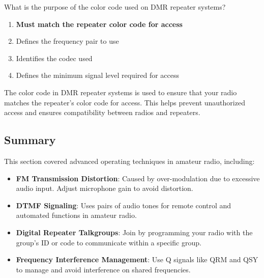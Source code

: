 
\begin{tcolorbox}[colback=gray!10!white,colframe=black!75!black,title={T2B12}]
    What is the purpose of the color code used on DMR repeater systems?
    \begin{enumerate}[label=\Alph*,noitemsep]
        \item \textbf{Must match the repeater color code for access}
        \item Defines the frequency pair to use
        \item Identifies the codec used
        \item Defines the minimum signal level required for access
    \end{enumerate}
\end{tcolorbox}
The color code in DMR repeater systems is used to ensure that your radio matches the repeater's color code for access. This helps prevent unauthorized access and ensures compatibility between radios and repeaters.


\subsection*{Summary}
This section covered advanced operating techniques in amateur radio, including:
\begin{itemize}
    \item \textbf{FM Transmission Distortion}: Caused by over-modulation due to excessive audio input. Adjust microphone gain to avoid distortion.
    \item \textbf{DTMF Signaling}: Uses pairs of audio tones for remote control and automated functions in amateur radio.
    \item \textbf{Digital Repeater Talkgroups}: Join by programming your radio with the group's ID or code to communicate within a specific group.
    \item \textbf{Frequency Interference Management}: Use Q signals like QRM and QSY to manage and avoid interference on shared frequencies.
\end{itemize}
